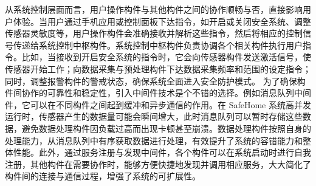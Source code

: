 从系统控制层面而言，用户操作构件与其他构件之间的协作顺畅与否，直接影响用户体验。当用户通过手机应用或控制面板下达指令，如开启或关闭安全系统、调整传感器灵敏度等，用户操作构件会准确接收并解析这些指令，然后将相应的控制信号传递给系统控制中枢构件。系统控制中枢构件负责协调各个相关构件执行用户指令。比如，当接收到开启安全系统的指令时，它会向传感器构件发送激活信号，使传感器开始工作；向数据采集与预处理构件下达数据采集频率和范围的设定指令；同时，调整报警构件的警戒状态，确保系统全面进入安全防护模式。 为了确保构件间协作的可靠性和稳定性，引入中间件技术是个不错的选择。例如消息队列中间件，它可以在不同构件之间起到缓冲和异步通信的作用。在 SafeHome 系统高并发运行时，传感器产生的数据量可能会瞬间增大，此时消息队列可以暂时存储这些数据，避免数据处理构件因负载过高而出现卡顿甚至崩溃。数据处理构件按照自身的处理能力，从消息队列中有序获取数据进行处理，有效提升了系统的容错能力和整体性能。此外，通过服务注册与发现中间件，各个构件可以在系统启动时进行自我注册，其他构件在需要协作时，能够方便快捷地发现并调用相应服务，大大简化了构件间的连接与通信过程，增强了系统的可扩展性。

